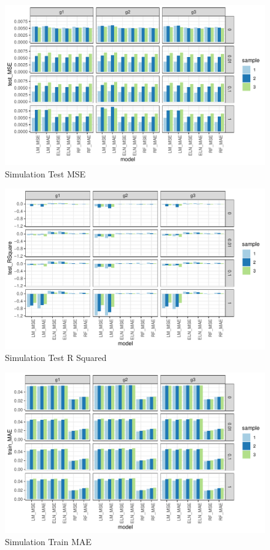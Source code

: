\documentclass[a4paper, table]{article}
\begin{document}
\begin{figure}
	\includegraphics{simulation_test_mse.pdf}
	\caption{Simulation Test MSE}
\end{figure}

\begin{figure}
	\includegraphics{simulation_test_rsquare.pdf}
	\caption{Simulation Test R Squared}
\end{figure}

\begin{figure}
	\includegraphics{simulation_train_mae.pdf}
	\caption{Simulation Train MAE}
\end{figure}
\end{document}
